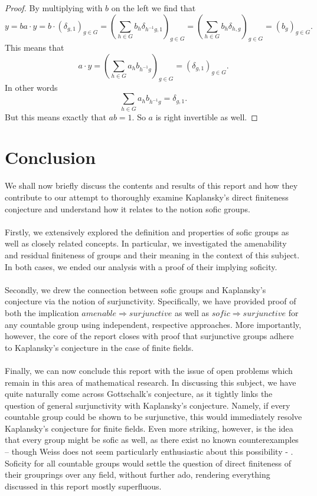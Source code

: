 \documentclass[titlepage, a4paper]{article}
\theoremstyle{definition}
\theoremstyle{remark}
\begin{document}
\begin{proof}
		By multiplying with $b$ on the left we find that \[
			 y = ba\cdot y = b\cdot (\delta_{g, 1})_{g \in G} = \left( \sum_{h \in G} b_{h} \delta_{h^{-1}g, 1} \right)_{g \in G} = \left( \sum_{h \in G} b_{h} \delta_{h, g} \right)_{g \in G}
		 = \left( b_{g} \right) _{g \in G}.\] 
		This means that \[
		a\cdot y = \left( \sum_{h \in G} a_h b_{h^{-1}g} \right)_{g \in G} = \left( \delta_{g, 1} \right) _{g \in G} 
	.\] 
	In other words
	\[
	\sum_{h \in G} a_h b_{h^{-1}g} = \delta_{g, 1}
	.\]
	But this means exactly that $ab = 1$. So  $a$ is right invertible as well. 
	\end{proof}	
	
	\section{Conclusion}

We shall now briefly discuss the contents and results of this report and how they contribute to our attempt to thoroughly examine Kaplansky’s direct finiteness conjecture and understand how it relates to the notion sofic groups.\\
\\
Firstly, we extensively explored the definition and properties of sofic  groups as well as closely related concepts. In particular, we investigated the amenability and residual finiteness of groups and their meaning in the context of this subject. In both cases, we ended our analysis with a proof of their implying soficity. \\
\\
Secondly, we drew the connection between sofic groups and Kaplansky’s conjecture via the notion of surjunctivity. Specifically, we have provided proof of both the implication $amenable \Rightarrow surjunctive$ as well as $sofic \Rightarrow surjunctive$ for any countable group using independent, respective approaches. More importantly, however, the core of the report closes with proof that surjunctive groups adhere to Kaplansky’s conjecture in the case of finite fields. \\
\\
Finally, we can now conclude this report with the issue of open problems which remain in this area of mathematical research. In discussing this subject, we have quite naturally come across Gottschalk’s conjecture, as it tightly links the question of general surjunctivity with Kaplansky’s conjecture. Namely, if every countable group could be shown to be surjunctive, this would immediately resolve Kaplansky’s conjecture for finite fields. Even more striking, however, is the idea that every group might be sofic as well, as there exist no known counterexamples – though Weiss does not seem particularly enthusiastic about this possibility \cite[introduction]{weiss_2000} -  . Soficity for all countable groups would settle the question of direct finiteness of their grouprings over any field, without further ado, rendering everything discussed in this report mostly superfluous.
\end{document}
